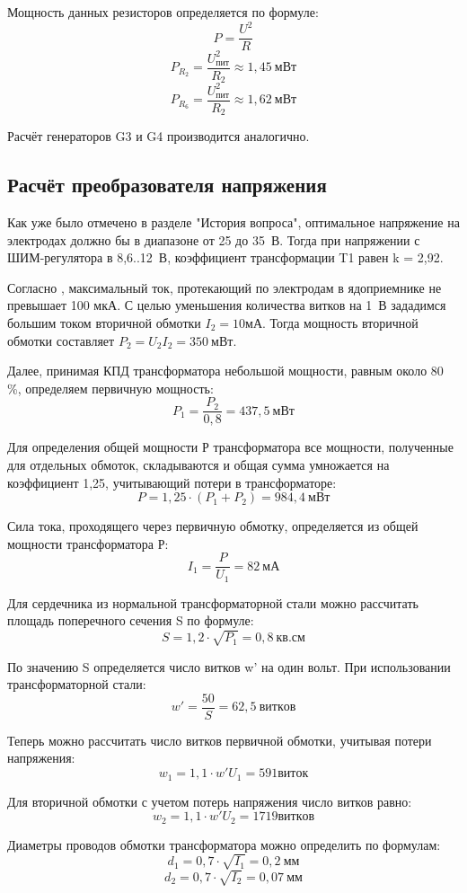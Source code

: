 Мощность данных резисторов определяется по формуле: \[P=\frac{U^2}{R}\]
\[P_{R_2}=\frac{U^2_{\text{пит}}}{R_2} \approx 1,45~\text{мВт}\]
\[P_{R_6}=\frac{U^2_{\text{пит}}}{R_2} \approx 1,62~\text{мВт}\]

Расчёт генераторов G3 и G4 производится аналогично.

\subsection*{Расчёт преобразователя напряжения}

Как уже было отмечено в разделе "История вопроса", оптимальное напряжение на электродах должно бы в диапазоне от 25 до 35~В. Тогда при напряжении с ШИМ-регулятора в 8,6..12~В, коэффициент трансформации T1 равен k = 2,92. 

Согласно \cite{Krylov_1995}, максимальный ток, протекающий по электродам в ядоприемнике не превышает 100 мкА. С целью уменьшения количества витков на 1~В зададимся большим током вторичной обмотки $I_2=10 \text{мА}$. Тогда мощность вторичной обмотки составляет $P_2=U_2I_2=350~\text{мВт}$.

Далее, принимая КПД трансформатора небольшой мощности, равным около 80 \%, определяем первичную мощность: 
\[P_1=\frac{P_2}{0,8}=437,5~мВт\]

Для определения общей мощности Р трансформатора все мощности, полученные для отдельных обмоток, складываются и общая сумма умножается на коэффициент 1,25, учитывающий потери в трансформаторе: 
\[P=1,25\cdot(P_1+P_2)=984,4~мВт\]

Сила тока, проходящего через первичную обмотку, определяется из общей мощности трансформатора Р:
\[I_1=\frac{P}{U_1}=82~мА\]

Для сердечника из нормальной трансформаторной стали можно рассчитать площадь поперечного сечения S по формуле: 
\[S=1,2\cdot\sqrt{P_1}=0,8~ \text{кв.см}\]

По значению S определяется число витков w' на один вольт. При использовании трансформаторной стали:
\[w'=\frac{50}{S}=62,5~витков\]

Теперь можно рассчитать число витков первичной обмотки, учитывая потери напряжения:
\[w_1=1,1\cdot w'U_1=591 виток\]

Для вторичной обмотки с учетом потерь напряжения число витков равно: 
\[w_2=1,1\cdot w'U_2=1719 витков\]

Диаметры проводов обмотки трансформатора можно определить по формулам:
\[d_1=0,7\cdot\sqrt{I_1}=0,2~ \text{мм}\]
\[d_2=0,7\cdot\sqrt{I_2}=0,07~ \text{мм}\]

